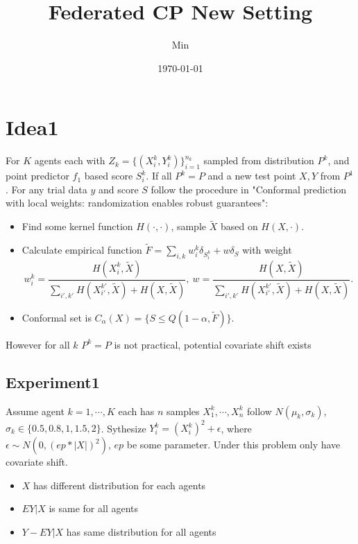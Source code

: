 \documentclass[12pt, a4paper, oneside]{article}
\title{\textbf{Federated CP New Setting}}
\author{Min}
\date{\today}
\begin{document}
\maketitle
\tableofcontents
\setcounter{page}{1}
\section{Idea1}
    For $K$ agents each with $Z_k=\{(X_i^k,Y_i^k)\}_{i=1}^{n_k}$ sampled from distribution $P^k$, and point predictor $f_1$ based score $S_i^k$. If all $P^k=P$ and a new test point $X,Y$ from $P^1$. For any trial data $y$ and score $S$ follow the procedure in "Conformal prediction with local weights: randomization enables robust guarantees"\cite{hore2023conformal}:
    \begin{itemize}
        \item Find some kernel function $H(\cdot,\cdot)$, sample $\tilde{X}$ based on $H(X,\cdot)$.
        \item Calculate empirical function $\tilde{F}=\overset{}{\underset{i,k}\sum}w_i^k\delta_{S_i^k}+w\delta_{S}$ with weight
        \begin{equation*}
            w_i^k=\dfrac{H(X_i^k,\tilde{X})}{\overset{}{\underset{i',k'}\sum}H(X_{i'}^{k'},\tilde{X})+H(X,\tilde{X})},\ w=\dfrac{H(X,\tilde{X})}{\overset{}{\underset{i',k'}\sum}H(X_{i'}^{k'},\tilde{X})+H(X,\tilde{X})}.
        \end{equation*}
        \item Conformal set is $C_\alpha(X)=\{S\leq Q(1-\alpha,\tilde{F})\}$.
    \end{itemize}


    However for all $k$ $P^k=P$ is not practical, potential covariate shift exists

\subsection{Experiment1}
    Assume agent $k=1,\cdots,K$ each has $n$ samples $X_1^k,\cdots,X_n^k$ follow $N(\mu_k,\sigma_k)$, $\sigma_k\in\{0.5,0.8,1,1.5,2\}$. Sythesize $Y_i^k=(X_i^k)^2+\epsilon$, where $\epsilon\sim N(0,(ep*|X|)^2)$, $ep$ be some parameter. Under this problem only have covariate shift.

    \begin{itemize}
        \item $X$ has different distribution for each agents
        \item $EY|X$ is same for all agents
        \item $Y-EY|X$ has same distribution for all agents
    \end{itemize}
    
\end{document}
